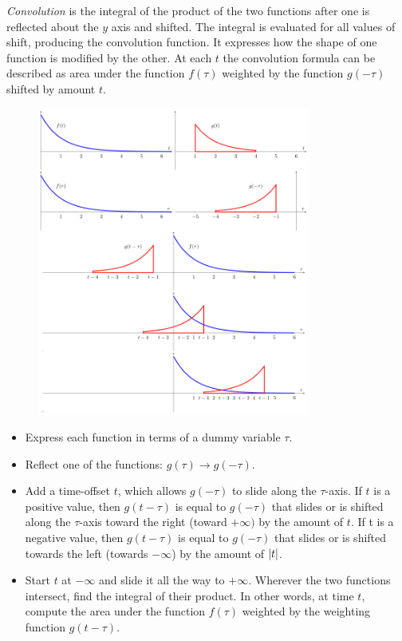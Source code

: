 \noindent \emph{Convolution} is the integral of the product of the two functions
after one is reflected about the $ y $ axis and shifted. The integral is evaluated
for all values of shift, producing the convolution function. It expresses how the shape
of one function is modified by the other. At each $ t $ the convolution formula can be
described as area under the function $ f(\tau) $ weighted by the function $ g(-\tau) $
shifted by amount $ t $.

\vspace{0.5cm}

\begin{figure}[htp]
	\centering
	\includegraphics[width=0.8\textwidth]{../assets/machine_learning_random/Convolution.png}
	\caption{}
\end{figure}

\begin{itemize}
	\item Express each function in terms of a dummy variable $ \tau $.
	\item Reflect one of the functions: $ g(\tau) \rightarrow g(-\tau) $.
	\item Add a time-offset $ t $, which allows $ g(-\tau) $ to slide along the
		$ \tau $-axis. If $ t $ is a positive value, then $ g(t-\tau) $ is
		equal to $ g(-\tau) $ that slides or is shifted along the $ \tau $-axis
		toward the right (toward $ +\infty) $ by the amount of $ t $. If t is a
		negative value, then $ g(t-\tau) $ is equal to $ g(-\tau) $ that slides
		or is shifted towards the left (towards $ -\infty $) by the amount of
		$ \abs{t} $.
	\item Start $ t $ at $ -\infty $ and slide it all the way to $ +\infty $.
		Wherever the two functions intersect, find the integral of their product.
		In other words, at time $ t $, compute the area under the function
		$ f(\tau) $ weighted by the weighting function $ g(t-\tau) $.
\end{itemize}



